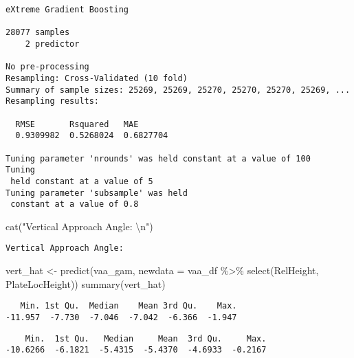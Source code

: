 \documentclass[
  letterpaper,
  DIV=11,
  numbers=noendperiod]{scrartcl}
\newenvironment{Shaded}{\begin{snugshade}}{\end{snugshade}}
\newcommand{\AttributeTok}[1]{\textcolor[rgb]{0.40,0.45,0.13}{#1}}
\newcommand{\FunctionTok}[1]{\textcolor[rgb]{0.28,0.35,0.67}{#1}}
\newcommand{\NormalTok}[1]{\textcolor[rgb]{0.00,0.23,0.31}{#1}}
\newcommand{\OtherTok}[1]{\textcolor[rgb]{0.00,0.23,0.31}{#1}}
\newcommand{\SpecialCharTok}[1]{\textcolor[rgb]{0.37,0.37,0.37}{#1}}
\newcommand{\StringTok}[1]{\textcolor[rgb]{0.13,0.47,0.30}{#1}}
\begin{document}
\begin{verbatim}
eXtreme Gradient Boosting 

28077 samples
    2 predictor

No pre-processing
Resampling: Cross-Validated (10 fold) 
Summary of sample sizes: 25269, 25269, 25270, 25270, 25270, 25269, ... 
Resampling results:

  RMSE       Rsquared   MAE      
  0.9309982  0.5268024  0.6827704

Tuning parameter 'nrounds' was held constant at a value of 100
Tuning
 held constant at a value of 5
Tuning parameter 'subsample' was held
 constant at a value of 0.8
\end{verbatim}

\begin{Shaded}
\begin{Highlighting}[]
\FunctionTok{cat}\NormalTok{(}\StringTok{"Vertical Approach Angle: }\SpecialCharTok{\textbackslash{}n}\StringTok{"}\NormalTok{)}
\end{Highlighting}
\end{Shaded}

\begin{verbatim}
Vertical Approach Angle: 
\end{verbatim}

\begin{Shaded}
\begin{Highlighting}[]
\NormalTok{vert\_hat }\OtherTok{\textless{}{-}} \FunctionTok{predict}\NormalTok{(vaa\_gam, }\AttributeTok{newdata =}\NormalTok{ vaa\_df }\SpecialCharTok{\%\textgreater{}\%} \FunctionTok{select}\NormalTok{(RelHeight, PlateLocHeight))}
\FunctionTok{summary}\NormalTok{(vert\_hat)}
\end{Highlighting}
\end{Shaded}

\begin{verbatim}
   Min. 1st Qu.  Median    Mean 3rd Qu.    Max. 
-11.957  -7.730  -7.046  -7.042  -6.366  -1.947 
\end{verbatim}

\begin{Shaded}
\end{Shaded}

\begin{verbatim}
    Min.  1st Qu.   Median     Mean  3rd Qu.     Max. 
-10.6266  -6.1821  -5.4315  -5.4370  -4.6933  -0.2167 
\end{verbatim}
\end{document}
